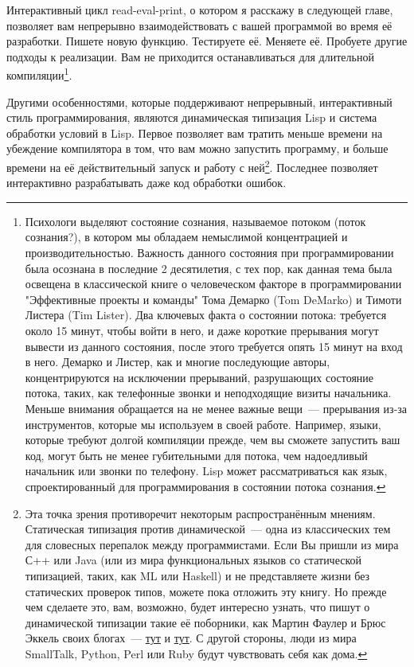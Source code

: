 Интерактивный цикл read-eval-print, о котором я расскажу в следующей главе, позволяет вам
непрерывно взаимодействовать с вашей программой во время её разработки. Пишете новую
функцию. Тестируете её. Меняете её. Пробуете другие подходы к реализации. Вам не
приходится останавливаться для длительной компиляции\footnote{Психологи выделяют состояние
  сознания, называемое потоком (поток сознания?), в котором мы обладаем немыслимой
  концентрацией и производительностью. Важность данного состояния при программировании
  была осознана в последние 2 десятилетия, с тех пор, как данная тема была освещена в
  классической книге о человеческом факторе в программировании "Эффективные проекты и
  команды" Тома Демарко (Tom DeMarko) и Тимоти Листера (Tim Lister). Два ключевых факта о
  состоянии потока: требуется около 15 минут, чтобы войти в него, и даже короткие
  прерывания могут вывести из данного состояния, после этого требуется опять 15 минут на
  вход в него. Демарко и Листер, как и многие последующие авторы, концентрируются на
  исключении прерываний, разрушающих состояние потока, таких, как телефонные звонки и
  неподходящие визиты начальника. Меньше внимания обращается на не менее важные вещи~---
  прерывания из-за инструментов, которые мы используем в своей работе. Например, языки,
  которые требуют долгой компиляции прежде, чем вы сможете запустить ваш код, могут быть
  не менее губительными для потока, чем надоедливый начальник или звонки по телефону. Lisp
  может рассматриваться как язык, спроектированный для программирования в состоянии потока
  сознания.}.

Другими особенностями, которые поддерживают непрерывный, интерактивный стиль
программирования, являются динамическая типизация Lisp и система обработки условий в
Lisp. Первое позволяет вам тратить меньше времени на убеждение компилятора в том, что вам
можно запустить программу, и больше времени на её действительный запуск и работу с
ней\footnote{Эта точка зрения противоречит некоторым распространённым мнениям. Статическая
  типизация против динамической~--- одна из классических тем для словесных перепалок между
  программистами. Если Вы пришли из мира С++ или Java (или из мира функциональных языков
  со статической типизацией, таких, как ML или Haskell) и не представляете жизни без
  статических проверок типов, можете пока отложить эту книгу. Но прежде чем сделаете это,
  вам, возможно, будет интересно узнать, что пишут о динамической типизации такие её
  поборники, как Мартин Фаулер и Брюс Эккель своих блогах~---
  \href{http://www.artima.com/weblogs/viewpost.jsp?thread=4639}{тут} и
  \href{http://www.mindview.net/WebLog/log-0025}{тут}. С другой стороны, люди из мира
  SmallTalk, Python, Perl или Ruby будут чувствовать себя как дома.}. Последнее позволяет
интерактивно разрабатывать даже код обработки ошибок.

